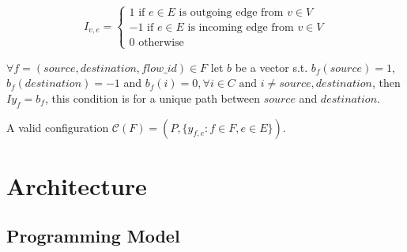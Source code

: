 \documentclass[conference, twocolumn]{IEEEtran}
\theoremstyle{definition}
\begin{document}


\begin{equation}
I_{v,e} = \left\{ \begin{array}{lrc}
1 \mbox{ if } e \in E \mbox{ is outgoing edge from } v \in V \\
-1 \mbox{ if } e \in E \mbox{ is incoming edge from } v \in V \\
0 \mbox{ otherwise}
\end{array}\right. 
\end{equation}

$\forall f=(source, destination, flow\_id) \in F$  let $b$ be a vector s.t.
$b_f(source) = 1$, $b_f(destination) = -1$ and $b_f(i) = 0, \forall i \in C
\mbox{ and } i \neq source, destination$, then $Iy_f=b_f$, this condition is for
a unique path between $source$ and $destination$.

A valid configuration ${\mathcal{C}}(F)=(P, \lbrace y_{f,e}:f \in F, e \in E
\rbrace )$.

\section{Architecture}
\subsection{Programming Model}
\end{document}
